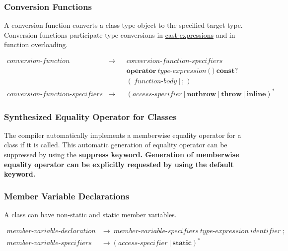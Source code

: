 \documentclass[a4paper,oneside,11pt]{article}
\begin{document}
\subsubsection{Conversion Functions}\label{sec:conversionfunctions}\label{conversionfunction}

A conversion function converts a class type object to the specified target type.
Conversion functions participate type conversions in \hyperref[cast]{cast\textrm{-}expressions} and in function overloading.

\begin{align*}
conversion\textrm{-}function &\rightarrow & &conversion\textrm{-}function\textrm{-}specifiers\\
& & &\textbf{operator} \>
\hyperref[typeexpr]{type\textrm{-}expression} \> \texttt{(} \> \texttt{)} \> \textbf{const}?\\
& & &(\> \hyperref[functionbody]{function\textrm{-}body} \> | \> \texttt{;} \>)\\
conversion\textrm{-}function\textrm{-}specifiers &\rightarrow & &(\hyperref[accessspecifier]{access\textrm{-}specifier} \> | \> \textbf{nothrow} \> | \>
\textbf{throw} \> | \> \textbf{inline})^*
\end{align*}

\subsubsection{Synthesized Equality Operator for Classes}\label{sec:synthesizedeq}

The compiler automatically implements a memberwise equality operator for a class if it is called.
This automatic generation of equality operator can be suppressed by using the \bf{suppress} keyword.
Generation of memberwise equality operator can be explicitly requested by using the \bf{default} keyword.

\subsubsection{Member Variable Declarations}\label{membervariabledeclaration}

A class can have non-static and static member variables.

\begin{align*}
member\textrm{-}variable\textrm{-}declaration &\rightarrow \> member\textrm{-}variable\textrm{-}specifiers \> \hyperref[typeexpr]{type\textrm{-}expression} \>
\hyperref[identifier]{identifier} \> \texttt{;}\\
member\textrm{-}variable\textrm{-}specifiers &\rightarrow (\hyperref[accessspecifier]{access\textrm{-}specifier} \> | \> \textbf{static})^*
\end{align*}
\end{document}
